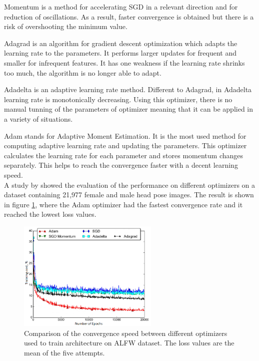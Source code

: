 \noindent
Momentum is a method for accelerating SGD in a relevant direction and for reduction of oscillations. As a result, faster convergence is obtained but there is a risk of overshooting the minimum value.\citep{Qian1999, Ruder2016}

\noindent
Adagrad is an algorithm for gradient descent optimization which adapts the learning rate to the parameters. It performs larger updates for frequent and smaller for infrequent features. It has one weakness if the learning rate shrinks too much, the algorithm is no longer able to adapt.\citep{Ruder2016}

\noindent
Adadelta is an adaptive learning rate method. Different to Adagrad, in Adadelta learning rate is monotonically decreasing. Using this optimizer, there is no manual tunning of the parameters of optimizer meaning that it can be applied in a variety of situations.\citep{Ruder2016}

\noindent
Adam stands for Adaptive Moment Estimation. It is the most used method for computing adaptive learning rate and updating the parameters.  This optimizer calculates the learning rate for each parameter and stores momentum changes separately. This helps to reach the convergence faster with a decent learning speed.\citep{Kingma2015}\\

\noindent
A study by \citeauthor{Patacchiola2017} \citep{Patacchiola2017} showed the evaluation of the performance on different optimizers on a dataset containing 21,977 female and male head pose images. The result is shown in figure \ref{fig:Graphofyrainingcost}, where the Adam optimizer had the fastest convergence rate and it reached the lowest loss values. 

\begin{figure} [H]
\centering
\includegraphics[width=0.6\textwidth]{figures/Graphofyrainingcost}
\caption{Comparison of the convergence speed between different optimizers used to train architecture on ALFW dataset. The loss values are the mean of the five attempts.\citep{Patacchiola2017}}
\label{fig:Graphofyrainingcost}  
\end{figure}



